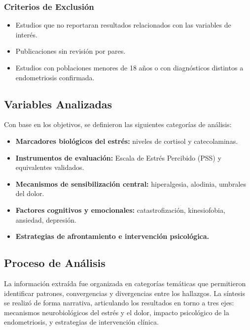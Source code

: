 \documentclass[12pt, a4paper]{article}
\begin{document}
\subsubsection{Criterios de Exclusión}

\begin{itemize}
  \item Estudios que no reportaran resultados relacionados con las variables de interés.
  \item Publicaciones sin revisión por pares.
  \item Estudios con poblaciones menores de 18 años o con diagnósticos distintos a
        endometriosis confirmada.
\end{itemize}

\subsection{Variables Analizadas}

Con base en los objetivos, se definieron las siguientes categorías de análisis:

\begin{itemize}
  \item \textbf{Marcadores biológicos del estrés:} niveles de cortisol y catecolaminas.
  \item \textbf{Instrumentos de evaluación:} Escala de Estrés Percibido (PSS) y
        equivalentes validados.
  \item \textbf{Mecanismos de sensibilización central:} hiperalgesia, alodinia, umbrales
        del dolor.
  \item \textbf{Factores cognitivos y emocionales:} catastrofización, kinesiofobia,
        ansiedad, depresión.
  \item \textbf{Estrategias de afrontamiento e intervención psicológica.}
\end{itemize}

\subsection{Proceso de Análisis}

La información extraída fue organizada en categorías temáticas que permitieron identificar
patrones, convergencias y divergencias entre los hallazgos. La síntesis se realizó de forma
narrativa, articulando los resultados en torno a tres ejes: mecanismos neurobiológicos del
estrés y el dolor, impacto psicológico de la endometriosis, y estrategias de intervención
clínica.
\end{document}
